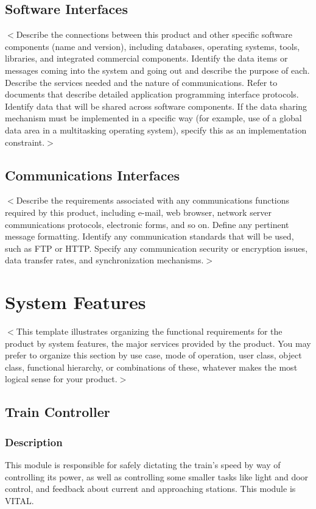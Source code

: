 \documentclass{scrreprt}
\begin{document}
\section{Software Interfaces}
$<$Describe the connections between this product and other specific software 
components (name and version), including databases, operating systems, tools, 
libraries, and integrated commercial components. Identify the data items or 
messages coming into the system and going out and describe the purpose of each.  
Describe the services needed and the nature of communications. Refer to 
documents that describe detailed application programming interface protocols.  
Identify data that will be shared across software components. If the data 
sharing mechanism must be implemented in a specific way (for example, use of a 
global data area in a multitasking operating system), specify this as an 
implementation constraint.$>$

\section{Communications Interfaces}
$<$Describe the requirements associated with any communications functions 
required by this product, including e-mail, web browser, network server 
communications protocols, electronic forms, and so on. Define any pertinent 
message formatting. Identify any communication standards that will be used, such 
as FTP or HTTP. Specify any communication security or encryption issues, data 
transfer rates, and synchronization mechanisms.$>$


\chapter{System Features}
$<$This template illustrates organizing the functional requirements for the 
product by system features, the major services provided by the product. You may 
prefer to organize this section by use case, mode of operation, user class, 
object class, functional hierarchy, or combinations of these, whatever makes the 
most logical sense for your product.$>$

\section{Train Controller}

\subsection{Description}
This module is responsible for safely dictating the train's speed by way of controlling its power, as well as controlling some smaller tasks like light and door control, and feedback about current and approaching stations. This module is VITAL.
\end{document}

